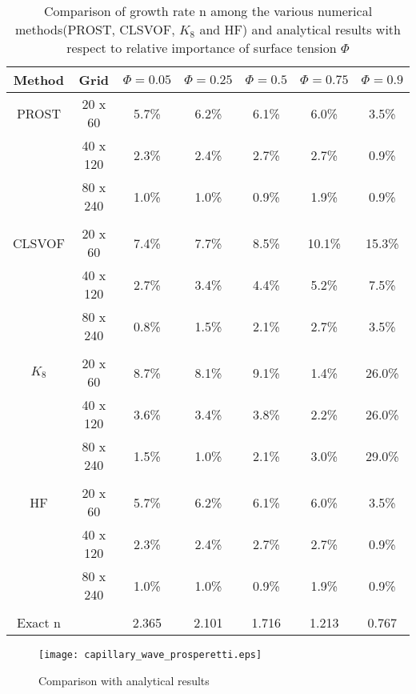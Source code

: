 \begin{table}[t]
  \begin{center}
    \caption{Comparison of growth rate n among the various numerical methods(PROST, CLSVOF, $K_8$ and HF) and analytical results with
    respect to relative importance of surface tension $\Phi$}
    \label{table:bp}
      \begin{tabular}{c c c c c c c}
	\toprule
	Method & Grid & $\Phi=0.05$ &  $\Phi=0.25$ &  $\Phi=0.5$ &  $\Phi=0.75$ &  $\Phi=0.9$ \\
	\midrule
	PROST &  20 x 60 & 5.7\% & 6.2\% & 6.1\% & 6.0\% & 3.5\% \\
	      &  40 x 120 & 2.3\% & 2.4\% & 2.7\% & 2.7\% & 0.9\% \\
	      &  80 x 240 & 1.0\% & 1.0\% & 0.9\% & 1.9\% & 0.9\% \\
	      \\
	CLSVOF &   20 x 60 & 7.4\% & 7.7\% & 8.5\% & 10.1\% & 15.3\% \\
	      &  40 x 120 & 2.7\% & 3.4\% & 4.4\% & 5.2\% & 7.5\% \\
	      &  80 x 240 & 0.8\% & 1.5\% & 2.1\% & 2.7\% & 3.5\% \\
	      \\
	$K_8$  &  20 x 60 & 8.7\% & 8.1\% & 9.1\% & 1.4\% & 26.0\% \\
	      &  40 x 120 & 3.6\% & 3.4\% & 3.8\% & 2.2\% & 26.0\% \\
	      &  80 x 240 & 1.5\% & 1.0\% & 2.1\% & 3.0\% & 29.0\% \\
	      \\
	HF    &  20 x 60 & 5.7\% & 6.2\% & 6.1\% & 6.0\% & 3.5\% \\
	      &  40 x 120 & 2.3\% & 2.4\% & 2.7\% & 2.7\% & 0.9\% \\
	      &  80 x 240 & 1.0\% & 1.0\% & 0.9\% & 1.9\% & 0.9\% \\
	      \\
	Exact n	& 	  & 2.365 & 2.101 & 1.716 & 1.213 & 0.767 	\\
	\bottomrule
      \end{tabular}
    \end{center}
 \end{table}
 
 \begin{figure}
 \centering
 \texttt{[image: capillary\_wave\_prosperetti.eps]}
 \caption{Comparison with analytical results}
\end{figure}

 